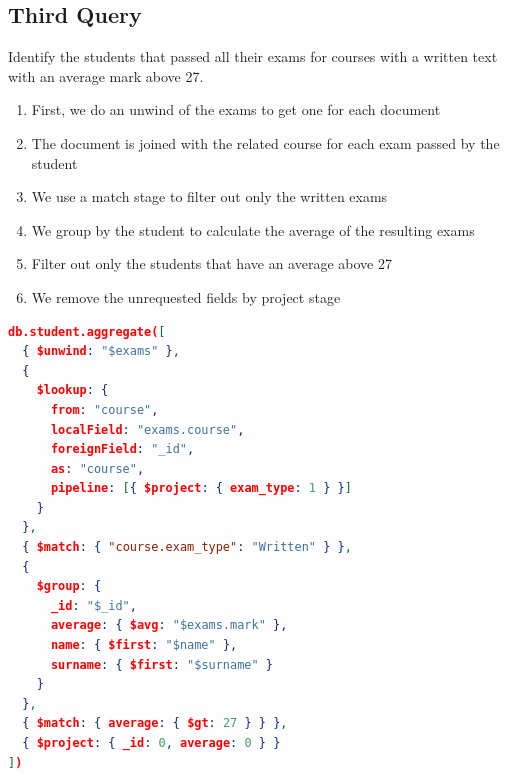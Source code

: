 \documentclass[pdflatex,sn-mathphys-num]{sn-jnl}
\begin{document}
\subsection{Third Query}
Identify the students that passed all their exams for courses with a written text with an average mark above 27.
\begin{enumerate}[label=(\alph*)]
\item First, we do an unwind of the exams to get one for each document
\item The document is joined with the related course for each exam passed by the student
\item We use a match stage to filter out only the written exams
\item We group by the student to calculate the average of the resulting exams
\item Filter out only the students that have an average above 27 
\item We remove the unrequested fields by project stage
\end{enumerate}
\begin{lstlisting}[language=json]
db.student.aggregate([
  { $unwind: "$exams" },
  {
    $lookup: {
      from: "course",
      localField: "exams.course",
      foreignField: "_id",
      as: "course",
      pipeline: [{ $project: { exam_type: 1 } }]
    }
  },
  { $match: { "course.exam_type": "Written" } },
  {
    $group: {
      _id: "$_id",
      average: { $avg: "$exams.mark" },
      name: { $first: "$name" },
      surname: { $first: "$surname" }
    }
  },
  { $match: { average: { $gt: 27 } } },
  { $project: { _id: 0, average: 0 } }
])
\end{lstlisting}
\end{document}
